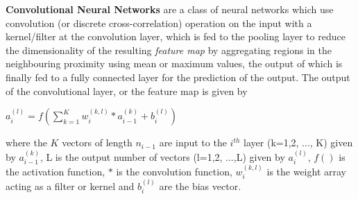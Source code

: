 \textbf{Convolutional Neural Networks} are a class of neural networks which use convolution (or discrete cross-correlation) operation on the input with a kernel/filter at the convolution layer, which is fed to the pooling layer to reduce the dimensionality of the resulting \emph{feature map} by aggregating regions in the neighbouring proximity using mean or maximum values, the output of which is finally fed to a fully connected layer for the prediction of the output. The output of the convolutional layer, or the feature map is given by \\
\begin{center}
    $a_i^{(l)} = f(\sum_{k=1}^K w_i^{(k,l)} * a_{i-1}^{(k)} + b_i^{(l)})$
\end{center}
where the $K$ vectors of length $n_{i-1}$ are input to the $i^{th}$ layer (k=1,2, ..., K) given by $a_{i-1}^{(k)}$, L is the output number of vectors (l=1,2, ...,L) given by $a_i^{(l)}$, $f()$ is the activation function, $*$ is the convolution function, $w_i^{(k,l)}$ is the weight array acting as a filter or kernel and $b_i^{(l)}$ are the bias vector.


